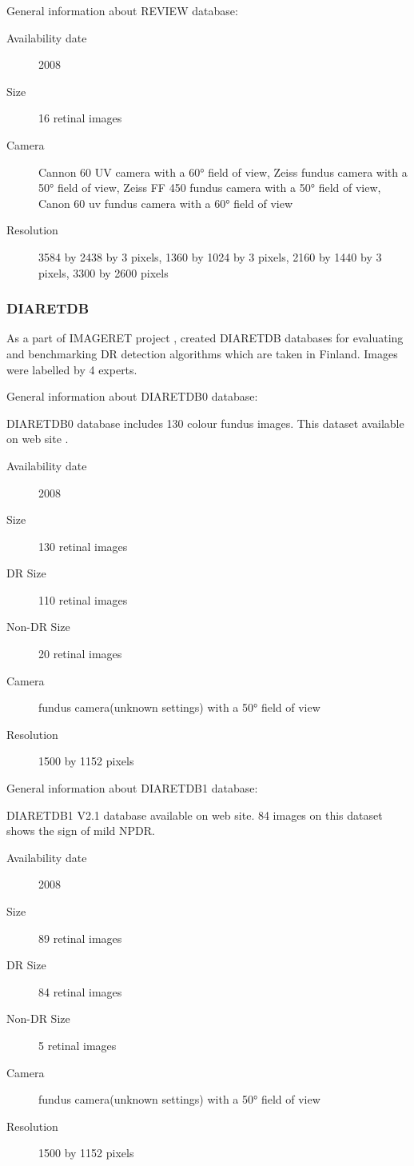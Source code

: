 General information about REVIEW database:
\begin{description}
    \item[Availability date] 2008
    \item[Size] 16 retinal images
    \item[Camera] Cannon 60 UV camera with a 60° field of view, Zeiss fundus camera with a 50° field of view, Zeiss  FF 450 fundus  camera with a 50°  field of view, Canon 60 uv fundus  camera with a 60° field of view
    \item[Resolution] 3584 by 2438 by 3 pixels, 1360 by 1024 by 3 pixels, 2160 by 1440 by 3 pixels, 3300 by 2600 pixels
\end{description}

\subsubsection{DIARETDB}

As a part of IMAGERET project \citep{IMAGERET}, \citet{kauppi2013constructing} created DIARETDB databases \citep{DIARETDB0} \citep{DIARETDB1V2_1} for evaluating and benchmarking DR detection algorithms which are taken in Finland. Images were labelled by 4 experts.

General information about DIARETDB0 database:

DIARETDB0 database includes 130 colour fundus images. This dataset available on \citet{DIARETDB0} web site \citep{kauppi2006diaretdb0}.

\begin{description}
    \item[Availability date] 2008
    \item[Size] 130 retinal images
    \item[DR Size] 110 retinal images
    \item[Non-DR Size] 20 retinal images
    \item[Camera] fundus camera(unknown settings) with a 50° field of view
    \item[Resolution] 1500 by 1152 pixels
\end{description}

General information about DIARETDB1 database:

DIARETDB1 V2.1 database \citep{kauppi2007diaretdb1} available on \citet{DIARETDB1V2_1} web site. 84 images on this dataset shows the sign of mild NPDR. 

\begin{description}
    \item[Availability date] 2008
    \item[Size] 89 retinal images
    \item[DR Size] 84 retinal images
    \item[Non-DR Size] 5 retinal images
    \item[Camera] fundus camera(unknown settings) with a 50° field of view
    \item[Resolution] 1500 by 1152 pixels
\end{description}


